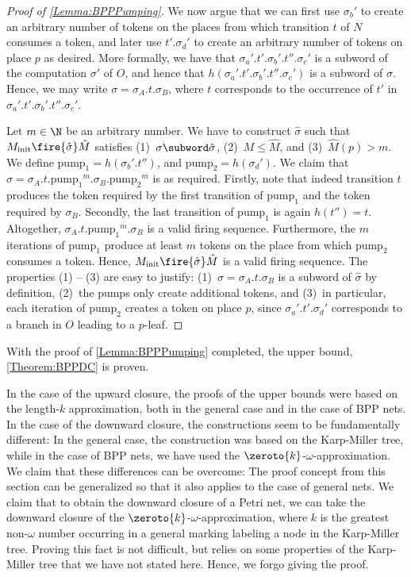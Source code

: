\documentclass[../../diss.tex]{subfiles}
\begin{document}
\begin{proof}[Proof of \cref{Lemma:BPPPumping}]
    We now argue that we can first use $\sigma_b'$ to create an arbitrary number of tokens on the places from which transition $t$ of $N$ consumes a token, and later use $t'.\sigma_d'$ to create an arbitrary number of tokens on place $p$ as desired.
%
    More formally, we have that $\sigma_a'.t'.\sigma_b'.t''.\sigma_c'$ is a subword of the computation $\sigma'$ of $O$, and hence that $h(\sigma_a'.t'.\sigma_b'.t''.\sigma_c')$ is a subword of $\sigma$.
    Hence, we may write $\sigma = \sigma_A.t.\sigma_B$, where $t$ corresponds to the occurrence of $t'$ in $\sigma_a'.t'.\sigma_b'.t''.\sigma_c'$.

    Let $m \in \N$ be an arbitrary number.
    We have to construct $\hat{\sigma}$ such that $\Minit \fire{\hat{\sigma}} \hat{M}$ satisfies
    (1)~$\sigma \subword \hat{\sigma}$,
    (2)~$M\leq \hat{M}$, and
    (3)~$\hat{M}(p)>m$.
    We define $\text{pump}_1 = h(\sigma_b'.t'')$, and $\text{pump}_2 = h(\sigma_d')$.
    We claim that $\hat{\sigma} = \sigma_A.t.{\text{pump}_1}^m.\sigma_B.{\text{pump}_2}^m$ is as required.
    Firstly, note that indeed transition $t$ produces the token required by the first transition of $\text{pump}_1$ and the token required by $\sigma_B$.
    Secondly, the last transition of $\text{pump}_1$ is again $h(t'') = t$.
    Altogether, $\sigma_A.t.{\text{pump}_1}^m.\sigma_B$ is a valid firing sequence.
    Furthermore, the $m$ iterations of $\text{pump}_1$ produce at least $m$ tokens on the place from which $\text{pump}_2$ consumes a token.
    Hence, $\Minit \fire{\hat{\sigma}} \hat{M}$ is a valid firing sequence.
    The properties (1) -- (3) are easy to justify: (1)~$\sigma = \sigma_A.t.\sigma_B$ is a subword of $\hat{\sigma}$ by definition, (2)~the pumps only create additional tokens, and (3)~in particular, each iteration of ${\text{pump}_2}$ creates a token on place $p$, since $\sigma_a'.t'.\sigma_d'$ corresponds to a branch in $O$ leading to a $p$-leaf.
\end{proof}

With the proof of \cref{Lemma:BPPPumping} completed, the upper bound, \cref{Theorem:BPPDC} is proven.

\begin{remark*}
In the case of the upward closure, the proofs of the upper bounds were based on the length-$k$ approximation, both in the general case and in the case of BPP nets.
In the case of the downward closure, the constructions seem to be fundamentally different:
In the general case, the construction was based on the Karp-Miller tree, while in the case of BPP nets, we have used the $\zeroto{k}$-$\omega$-approximation.
We claim that these differences can be overcome:
The proof concept from this section can be generalized so that it also applies to the case of general nets.
We claim that to obtain the downward closure of a Petri net, we can take the downward closure of the $\zeroto{k}$-$\omega$-approximation, where $k$ is the greatest non-$\omega$ number occurring in a general marking labeling a node in the Karp-Miller tree.
Proving this fact is not difficult, but relies on some properties of the Karp-Miller tree that we have not stated here.
Hence, we forgo giving the proof.
\end{remark*}
\end{document}
